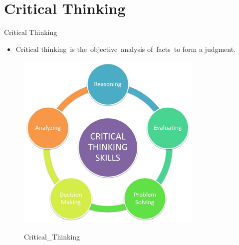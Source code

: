 \documentclass[
 size=14pt,
 paper=smartboard,  %
 mode=present, 		%
 display=slides, 	%
 style=tuliplab,  	%
 pauseslide,
 fleqn,leqno]{powerdot}{}
\begin{document}
\section{Critical Thinking}

\begin{slide}[toc=,bm=]{Critical Thinking}

\begin{itemize}
  \item Critical thinking is the objective analysis of facts to form a judgment.
\end{itemize}

\begin{figure}
  \centering
  \includegraphics[width=3.5in]{figures/management/Critical_Thinking.eps}\\
  \caption{Critical_Thinking}
\end{figure}

\end{slide}
\end{document}
